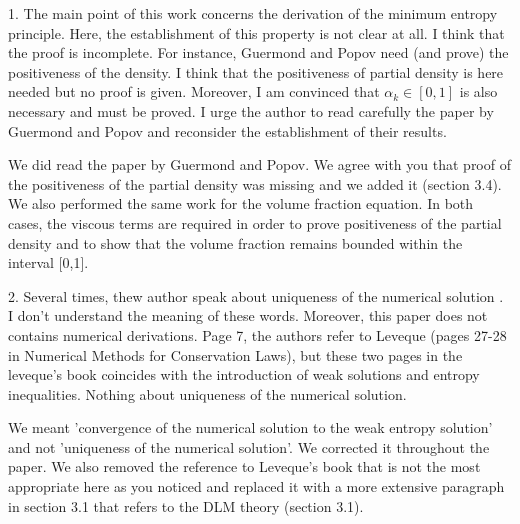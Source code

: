 \documentclass{article}
\newcommand{\tcr}[1]{\textcolor{red}{#1}}
\newcommand{\tcg}[1]{\textcolor{green}{#1}}
\begin{document}
\bigskip


{\color{blue}
1. The main point of this work concerns the derivation of the minimum
entropy principle. Here, the establishment of this property is not clear
at all. I think that the proof is incomplete. For instance, Guermond
and Popov need (and prove) the positiveness of the density. I think that
the positiveness of partial density is here needed but no proof is given.
Moreover, I am convinced that $\alpha_k \in [0, 1]$ is also necessary and must be
proved. I urge the author to read carefully the paper by Guermond and
Popov and reconsider the establishment of their results.}

We did read the paper by Guermond and Popov. We agree with you that proof of the positiveness of the partial density was missing and we added it (section 3.4).
We also performed the same work for the volume fraction equation. In both cases, the viscous terms are required in order to prove positiveness of the
partial density and to show that the volume fraction remains bounded within the interval [0,1].

\bigskip


{\color{blue}
2. Several times, thew author speak about uniqueness of the numerical solution
. I don’t understand the meaning of these words. Moreover, this
paper does not contains numerical derivations. Page 7, the authors refer
to Leveque (pages 27-28 in Numerical Methods for Conservation Laws),
but these two pages in the leveque’s book coincides with the introduction
of weak solutions and entropy inequalities. Nothing about uniqueness of
the numerical solution.}

We meant 'convergence of the numerical solution to the weak entropy solution' and not 'uniqueness of the numerical solution'. We corrected it throughout the paper.
We also removed the reference to Leveque's book that is not the most appropriate here as you noticed and replaced it with a more extensive paragraph in section 3.1 that refers to
the DLM theory (section 3.1).

\bigskip
\end{document}
